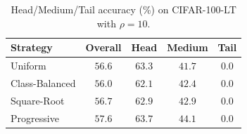 \begin{table}[htbp]
\centering
\caption{Head/Medium/Tail accuracy (\%) on CIFAR-100-LT with $\rho = 10$.}
\label{tab:hmt_rho10}
\begin{tabular}{lcccc}
\toprule
\textbf{Strategy} & \textbf{Overall} & \textbf{Head} & \textbf{Medium} & \textbf{Tail} \\
\midrule
Uniform & $56.6$ & $63.3$ & $41.7$ & $0.0$ \\
Class-Balanced & $56.0$ & $62.1$ & $42.4$ & $0.0$ \\
Square-Root & $56.7$ & $62.9$ & $42.9$ & $0.0$ \\
Progressive & $57.6$ & $63.7$ & $44.1$ & $0.0$ \\
\bottomrule
\end{tabular}
\end{table}